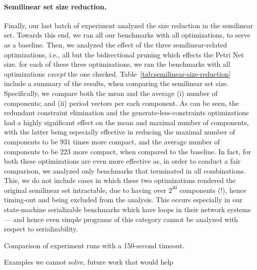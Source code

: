 \paragraph{Semilinear set size reduction.}

Finally, our last batch of experiment analyzed the size reduction in the semilinear set.
%
Towards this end, we ran all our benchmarks with all optimizations, to serve as a baseline. 
%
Then, we analyzed the effect of the three semilinear-related optimizations, i.e., all but the bidirectional pruning which effects the Petri Net size. for each of these three optimizations, we ran the benchmarks with all optimizations \textit{except} the one checked.
%
Table~\ref{tab:semilinear-size-reduction} include a summary of the results, when comparing the semilinear set size.
%
Specifically, we compare both the mean and the average (i) number of components; and (ii) period vectors per each component.
%
As can be seen, the redundant constraint elimination and the generate-less-constraints optimizations had a highly significant effect on the mean and maximal number of components, with the latter being especially effective in reducing the maximal number of components to be $931$ times more compact, and the average number of components to be $223$ more compact, when compared to the baseline.
%
In fact, for both these optimizations are even more effective as, in order to conduct a fair comparison, we analyzed only benchmarks that terminated in all combinations.
%
This, we do not include cases in which these two optimizations rendered the original semilinear set intractable, due to having over $2^30$ components (!), hence timing-out and being excluded from the analysis.
%
This occurs especially in our state-machine serializable benchmarks which have loops in their network systems --- and hence even simple programs of this category cannot be analyzed with respect to serializability.



\begin{table}[htbp]
	\centering
	
	\caption{Comparison of experiment runs with a 150-second timeout.}
	\label{tab:semilinear-size-reduction}
\end{table}

Examples we cannot solve, future work that would help




